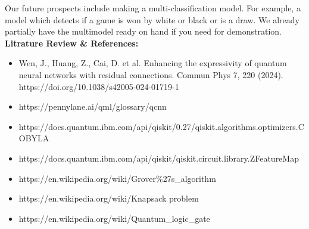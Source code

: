 \documentclass[a4paper]{article}
\begin{document}
Our future prospects include making a multi-classification model. For example, a model which detects if a game is won by white or black or is a draw. We already partially have the multimodel ready on hand if you need for demonstration.\\

\indent \textbf{Litrature Review \& References: }
\begin{itemize}
\item Wen, J., Huang, Z., Cai, D. et al. Enhancing the expressivity of quantum neural networks with residual connections. Commun Phys 7, 220 (2024). https://doi.org/10.1038/s42005-024-01719-1
\item https://pennylane.ai/qml/glossary/qcnn
\item https://docs.quantum.ibm.com/api/qiskit/0.27/qiskit.algorithms.optimizers.COBYLA
\item https://docs.quantum.ibm.com/api/qiskit/qiskit.circuit.library.ZFeatureMap
\item https://en.wikipedia.org/wiki/Grover\%27s\_algorithm
\item https://en.wikipedia.org/wiki/Knapsack problem
\item https://en.wikipedia.org/wiki/Quantum\_logic\_gate

\end{itemize}
\end{document}
